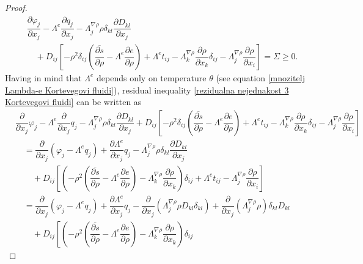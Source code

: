 \documentclass[10pt,a4paper]{amsart}
\begin{document}
\begin{proof}
\begin{align}
		& \dfrac{\partial\varphi_j}{\partial x_j} - \Lambda^e \dfrac{\partial q_j}{\partial x_j} - \Lambda^{\nabla\rho}_j\rho\delta_{kl}\dfrac{\partial D_{kl}}{\partial x_j}
		\\
		& \quad +D_{ij}\left[-\rho^2\delta_{ij}\left(\overline{\dfrac{\partial s}{\partial\rho}}-\Lambda^e\dfrac{\partial e}{\partial\rho}\right)+\Lambda^et_{ij}-\Lambda^{\nabla\rho}_k\dfrac{\partial\rho}{\partial x_k}\delta_{ij}-\Lambda^{\nabla\rho}_j\dfrac{\partial\rho}{\partial x_i}\right]=\Sigma\geq 0. 
		\nonumber 
	\end{align}
	Having in mind that $\Lambda^e$ depends only on temperature $\theta$ (see equation \eqref{mnozitelj Lambda-e Kortevegovi fluidi}), residual inequality \eqref{rezidualna nejednakost 3 Kortevegovi fluidi} can be written as
	\begin{align*}
		& \dfrac{\partial}{\partial x_j}\varphi_j - \Lambda^e\dfrac{\partial}{\partial x_j}q_j 
			- \Lambda^{\nabla\rho}_j\rho\delta_{kl} \dfrac{\partial D_{kl}}{\partial x_j} 
			+ D_{ij} \left[ -\rho^2\delta_{ij}\left(\overline{\dfrac{\partial s}{\partial\rho}} 
			- \Lambda^e\dfrac{\partial e}{\partial\rho} \right) + \Lambda^et_{ij} 
			- \Lambda^{\nabla\rho}_k\dfrac{\partial\rho}{\partial x_k}\delta_{ij} 
			- \Lambda^{\nabla\rho}_j\dfrac{\partial\rho}{\partial x_i} \right] 
		\\
		& \quad = \dfrac{\partial}{\partial x_j} \left( \varphi_j - \Lambda^eq_j\right) 
			+ \dfrac{\partial\Lambda^e}{\partial x_j}q_j 
			- \Lambda^{\nabla\rho}_j\rho\delta_{kl} \dfrac{\partial D_{kl}}{\partial x_j} 
		\\ 
		& \qquad + D_{ij} \left[ \left( -\rho^2\left(\overline{\dfrac{\partial s}{\partial\rho}} 
			- \Lambda^e \dfrac{\partial e}{\partial\rho} \right) 
			- \Lambda^{\nabla\rho}_k\dfrac{\partial\rho}{\partial x_k} \right) \delta_{ij} 
			+ \Lambda^e t_{ij} - \Lambda^{\nabla\rho}_j\dfrac{\partial\rho}{\partial x_i} \right] \\
			& \quad = \dfrac{\partial}{\partial x_j} \left( \varphi_j - \Lambda^eq_j \right) 
			+ \dfrac{\partial\Lambda^e}{\partial x_j}q_j 
			- \dfrac{\partial}{\partial x_j} \left( \Lambda^{\nabla\rho}_j\rho D_{kl} \delta_{kl} \right) 
			+ \dfrac{\partial}{\partial x_j}\left(\Lambda^{\nabla\rho}_j\rho\right) \delta_{kl} D_{kl} \\
			& \qquad + D_{ij} \left[ \left( -\rho^2\left(\overline{\dfrac{\partial s}{\partial\rho}} 
			- \Lambda^e\dfrac{\partial e}{\partial\rho} \right) 
			- \Lambda^{\nabla\rho}_k\dfrac{\partial\rho}{\partial x_k} \right) \delta_{ij} 

\end{align*}
\end{proof}
\end{document}

